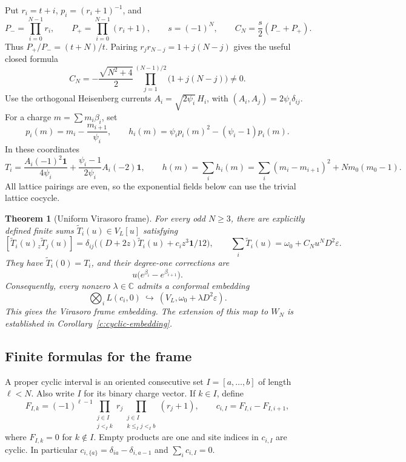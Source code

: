 \documentclass[11pt,a4paper]{article}
\numberwithin{equation}{section}
\newtheorem{theorem}{Theorem}[section]
\theoremstyle{definition}\newtheorem{definition}[theorem]{Definition}
\theoremstyle{remark}\newtheorem{remark}[theorem]{Remark}
\newcommand{\C}{\mathbb C}\newcommand{\Z}{\mathbb Z}\newcommand{\Q}{\mathbb Q}
\newcommand{\one}{\mathbf1}\newcommand{\B}{\mathcal B}\newcommand{\W}{W_N}
\begin{document}
Put $r_i=t+i$, $p_i=(r_i+1)^{-1}$, and
\[
 P_- =\prod_{i=0}^{N-1}r_i,\qquad P_+=\prod_{i=0}^{N-1}(r_i+1),\qquad
 s=(-1)^N,\qquad C_N=\frac{s}{2}(P_-+P_+).
\]
Thus $P_+/P_-=(t+N)/t$. Pairing $r_jr_{N-j}=1+j(N-j)$ gives the useful closed formula
\[
 C_N=-\frac{\sqrt{N^2+4}}2
           \prod_{j=1}^{(N-1)/2}\bigl(1+j(N-j)\bigr)\ne0.
\]
Use the orthogonal Heisenberg currents $A_i=\sqrt{2\psi_i}\,H_i$, with $(A_i,A_j)=2\psi_i\delta_{ij}$. For a charge $m=\sum m_i\beta_i$, set
\[
 p_i(m)=m_i-\frac{m_{i+1}}{\psi_i},\qquad
 h_i(m)=\psi_i p_i(m)^2-(\psi_i-1)p_i(m).
\]
In these coordinates
\[
 T_i=\frac{A_i(-1)^2\one}{4\psi_i}
       +\frac{\psi_i-1}{2\psi_i}A_i(-2)\one,
 \qquad h(m)=\sum_i h_i(m)=\sum_i(m_i-m_{i+1})^2+Nm_0(m_0-1).
\]
All lattice pairings are even, so the exponential fields below can use the trivial lattice cocycle.

\begin{theorem}[Uniform Virasoro frame]\label{c:screening-frame}
For every odd $N\ge3$, there are explicitly defined finite sums $\widetilde T_i(u)\in V_L[u]$ satisfying
\[
 [\widetilde T_i(u){}_{z}\widetilde T_j(u)]
 =\delta_{ij}\big((D+2z)\widetilde T_i(u)+c_i z^3\one/12\big),
 \qquad
 \sum_i\widetilde T_i(u)=\omega_0+C_Nu^N D^2\varepsilon.
\]
They have $\widetilde T_i(0)=T_i$, and their degree-one corrections are
\[
 u\big(e^{\beta_i}-e^{\beta_{i+1}}\big).
\]
Consequently, every nonzero $\lambda\in\C$ admits a conformal embedding
\[
 \bigotimes_i L(c_i,0)\ \hookrightarrow\ (V_L,\omega_0+\lambda D^2\varepsilon).
\]
This gives the Virasoro frame embedding. The extension of this map to
$W_N$ is established in Corollary~\ref{c:cyclic-embedding}.
\end{theorem}

\subsection*{Finite formulas for the frame}
A proper cyclic interval is an oriented consecutive set $I=[a,\ldots,b]$ of length $\ell<N$. Also write $I$ for its binary charge vector. If $k\in I$, define
\[
 F_{I,k}=(-1)^{\ell-1}
   \prod_{\substack{j\in I\\j<_I k}}r_j
   \prod_{\substack{j\in I\\k\le_I j<_I b}}(r_j+1),
 \qquad c_{i,I}=F_{I,i}-F_{I,i+1},
\]
where $F_{I,k}=0$ for $k\notin I$. Empty products are one and site indices in $c_{i,I}$ are cyclic. In particular $c_{i,\{a\}}=\delta_{ia}-\delta_{i,a-1}$ and $\sum_i c_{i,I}=0$.
\end{document}
